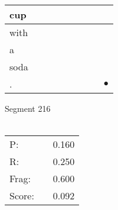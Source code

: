 \documentclass[landscape]{article}
\newcommand{\ssp}{\hspace{2pt}}
\newcommand{\mex}{\cellcolor{g}$\bullet$}
\begin{document}
\begin{tabular}{|l|p{10pt}|p{10pt}|p{10pt}|p{10pt}|p{10pt}|p{10pt}|p{10pt}|p{10pt}|}
\hline
\ssp cup \ssp&\hspace{2pt}&\hspace{2pt}&\hspace{2pt}&\hspace{2pt}&\hspace{2pt}&\hspace{2pt}&\hspace{2pt}&\hspace{2pt}\\
\hline
\ssp with \ssp&\hspace{2pt}&\hspace{2pt}&\hspace{2pt}&\hspace{2pt}&\hspace{2pt}&\hspace{2pt}&\hspace{2pt}&\hspace{2pt}\\
\hline
\ssp a \ssp&\hspace{2pt}&\hspace{2pt}&\hspace{2pt}&\hspace{2pt}&\hspace{2pt}&\hspace{2pt}&\hspace{2pt}&\hspace{2pt}\\
\hline
\ssp soda \ssp&\hspace{2pt}&\hspace{2pt}&\hspace{2pt}&\hspace{2pt}&\hspace{2pt}&\hspace{2pt}&\hspace{2pt}&\hspace{2pt}\\
\hline
\ssp \cellcolor{ref7}. \ssp&\hspace{2pt}&\hspace{2pt}&\hspace{2pt}&\hspace{2pt}&\hspace{2pt}&\hspace{2pt}&\hspace{2pt}&\hspace{2pt}\mex\\
\hline
\end{tabular}

\vspace{6pt}
\noindent Segment 216\\\\
\noindent\begin{tabular}{lm{12pt}r}
\hline
P:&&0.160\\
R:&&0.250\\
Frag:&&0.600\\
Score:&&0.092\\
\end{tabular}
\end{document}
